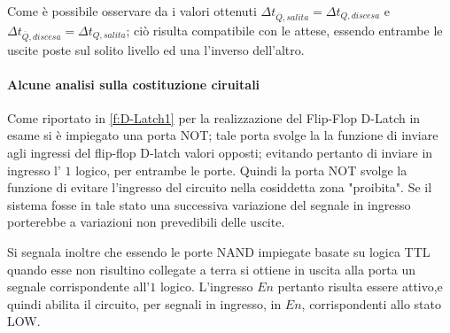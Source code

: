	Come è possibile osservare da i valori ottenuti $\Delta t_{\overline{Q},salita} = \Delta t_{{Q},discesa}$ e $\Delta t_{\overline{Q},discesa} = \Delta t_{{Q},salita}$; ciò risulta compatibile con le attese, essendo entrambe le uscite poste sul solito livello ed una l'inverso dell'altro.
	\paragraph{Alcune analisi sulla costituzione ciruitali }
	Come riportato in \figurename{ \ref{f:D-Latch1}} per la realizzazione del Flip-Flop D-Latch in esame si è impiegato una porta NOT;
	tale porta svolge la la funzione di inviare agli ingressi del flip-flop D-latch valori opposti; evitando pertanto di inviare in ingresso l' $1$ logico, per entrambe le porte.
	Quindi la porta NOT svolge la funzione di evitare l'ingresso del circuito nella cosiddetta zona "proibita".
	Se il sistema fosse in tale stato una successiva variazione del segnale in ingresso porterebbe a variazioni non prevedibili delle uscite.

	Si segnala inoltre che essendo le porte NAND impiegate basate su logica TTL quando esse non risultino collegate a terra si ottiene in uscita alla porta un segnale corrispondente all'$1$ logico.
	L'ingresso $En$ pertanto risulta essere attivo,e quindi abilita il circuito, per
	segnali in ingresso, in $En$, corrispondenti allo stato LOW.
